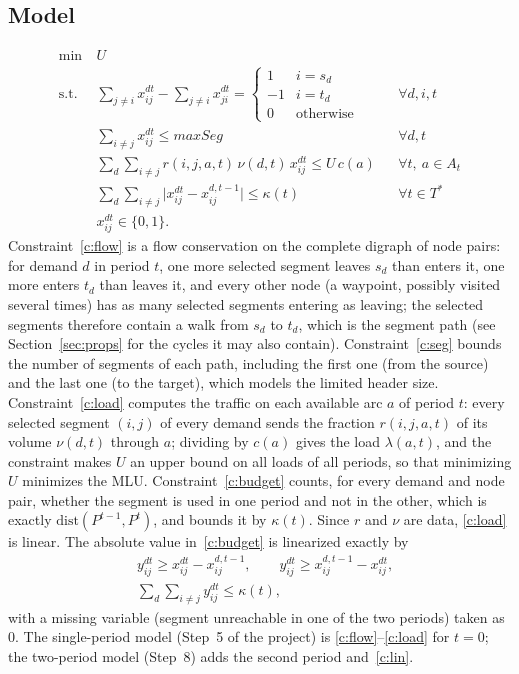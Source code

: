 \documentclass[conference]{IEEEtran}
\begin{document}
\subsection{Model}
\begin{align}
\min\ & U\nonumber\\
\text{s.t. } & \sum_{j\neq i}x^{dt}_{ij}-\sum_{j\neq i}x^{dt}_{ji}=
\begin{cases}1& i=s_d\\-1& i=t_d\\0&\text{otherwise}\end{cases} && \forall d,i,t \label{c:flow}\\
& \sum_{i\neq j}x^{dt}_{ij}\le maxSeg && \forall d,t \label{c:seg}\\
& \sum_d\sum_{i\neq j} r(i,j,a,t)\,\nu(d,t)\,x^{dt}_{ij}\le U\,c(a) && \forall t,\ a\in A_t \label{c:load}\\
& \sum_d\sum_{i\neq j}\bigl|x^{dt}_{ij}-x^{d,t-1}_{ij}\bigr|\le\kappa(t) && \forall t\in T^* \label{c:budget}\\
& x^{dt}_{ij}\in\{0,1\}.\nonumber
\end{align}
Constraint~\eqref{c:flow} is a flow conservation on the complete digraph of node pairs: for demand $d$ in period $t$, one more selected segment leaves $s_d$ than enters it, one more enters $t_d$ than leaves it, and every other node (a waypoint, possibly visited several times) has as many selected segments entering as leaving; the selected segments therefore contain a walk from $s_d$ to $t_d$, which is the segment path (see Section~\ref{sec:props} for the cycles it may also contain). Constraint~\eqref{c:seg} bounds the number of segments of each path, including the first one (from the source) and the last one (to the target), which models the limited header size. Constraint~\eqref{c:load} computes the traffic on each available arc $a$ of period $t$: every selected segment $(i,j)$ of every demand sends the fraction $r(i,j,a,t)$ of its volume $\nu(d,t)$ through $a$; dividing by $c(a)$ gives the load $\lambda(a,t)$, and the constraint makes $U$ an upper bound on all loads of all periods, so that minimizing $U$ minimizes the MLU. Constraint~\eqref{c:budget} counts, for every demand and node pair, whether the segment is used in one period and not in the other, which is exactly $\mathrm{dist}(P^{t-1},P^t)$, and bounds it by $\kappa(t)$. Since $r$ and $\nu$ are data, \eqref{c:load} is linear. The absolute value in~\eqref{c:budget} is linearized exactly by
\begin{align}
& y^{dt}_{ij}\ge x^{dt}_{ij}-x^{d,t-1}_{ij},\qquad y^{dt}_{ij}\ge x^{d,t-1}_{ij}-x^{dt}_{ij},\nonumber\\
& \textstyle\sum_d\sum_{i\neq j}y^{dt}_{ij}\le\kappa(t),\label{c:lin}
\end{align}
with a missing variable (segment unreachable in one of the two periods) taken as 0. The single-period model (Step~5 of the project) is \eqref{c:flow}--\eqref{c:load} for $t=0$; the two-period model (Step~8) adds the second period and~\eqref{c:lin}.
\end{document}
